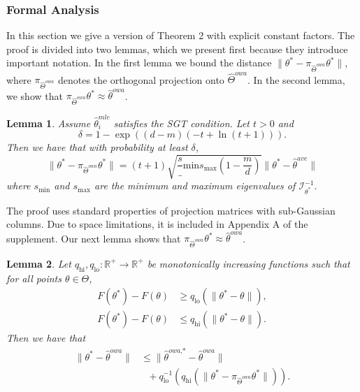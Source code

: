 \documentclass[twoside]{article}
\newtheorem{lemma}{Lemma}
\newcommand{\smin}{s_\text{min}}
\newcommand{\smax}{s_\text{max}}
\newcommand{\qhi}{q_\text{hi}}
\newcommand{\qlo}{q_\text{lo}}
\newcommand{\W}{{\hat \Theta^{\textit{owa}}}}
\newcommand{\w}{\theta}
\newcommand{\wowa}{\hat\w^{owa}}
\newcommand{\wowastar}{\hat\w^{\textit{owa,*}}}
\newcommand{\wave}{\hat\w^{ave}}
\newcommand{\wmle}{\hat\w^{mle}}
\newcommand{\wstar}{{\w^{*}}}
\newcommand{\I}{\mathcal I}
\newcommand{\ltwo}[1]{{\lVert {#1} \rVert}}
\newcommand{\proj}[1]{\pi_{{#1}}}
\begin{document}
\subsubsection{Formal Analysis}

In this section we give a version of Theorem 2 with explicit constant factors.
The proof is divided into two lemmas,
which we present first because they introduce important notation.
In the first lemma we bound the distance $\ltwo{\wstar-\proj{\W}\wstar}$,
where $\proj{\W}$ denotes the orthogonal projection onto $\W$.
In the second lemma, we show that $\proj{\W}\wstar \approx \wowa$.


\begin{lemma}
\label{lem:proj}
Assume $\wmle_i$ satisfies the SGT condition.
Let $t>0$ and
\begin{equation}
\delta = 1-\exp((d-m)(-t+\ln(t+1)))
.
\label{eq:delta}
\end{equation}
Then we have that with probability at least $\delta$,
\begin{equation}
\ltwo{\wstar-\proj\W\wstar}
=
(t+1)\sqrt{\frac\smin\smax\left(1-\frac{m}{d}\right)}\ltwo{\wstar - \wave}
\end{equation}
where $\smin$ and $\smax$ are the minimum and maximum eigenvalues of $\I_\wstar^{-1}$.
\end{lemma}

The proof uses standard properties of projection matrices with sub-Gaussian columns.
Due to space limitations, it is included in Appendix A of the supplement.
%
%
Our next lemma shows that $\proj{\W}\wstar \approx \wowa$.

\begin{lemma}
Let $\qhi,\qlo : \mathbb{R}^+ \to \mathbb{R}^+$ be monotonically increasing functions such that for all points $\w\in\Theta$,
\begin{align}
F(\wstar) - F(\w) &\ge \qlo \left( \ltwo {\wstar - \w} \right)
,
\\
F(\wstar) - F(\w) &\le \qhi \left( \ltwo {\wstar - \w} \right)
.
\end{align}
Then we have that
\begin{equation}
\begin{aligned}
\ltwo {\wstar-\wowa}
&\le
\ltwo{\wowastar-\wowa}
\\
&~~~+
\qlo^{-1} \left(
    \qhi \left( \ltwo {\wstar - \proj\W\wstar} \right)
\right)
.
\label{eq:lemma2res}
\end{aligned}
\end{equation}
\end{lemma}
\end{document}
